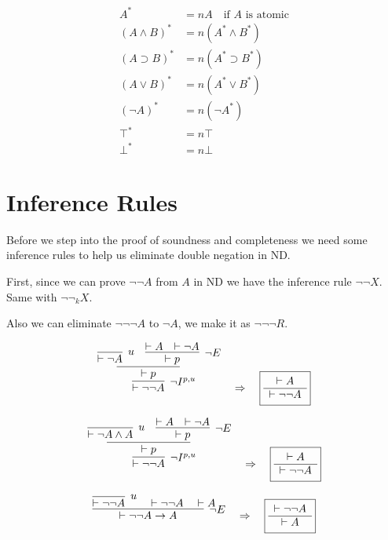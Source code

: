 \documentclass{article}
\begin{document}
\begin{align*}
A^* &= nA \quad \text{if } A \text{ is atomic} \\
(A \land B)^* &= n(A^* \land B^*) \\
(A \supset B)^* &= n(A^* \supset B^*) \\
(A \lor B)^* &= n(A^* \lor B^*) \\
(\neg A)^* &= n(\neg A^*) \\
\top^* &= n\top \\
\bot^* &= n\bot
\end{align*}




\section{Inference Rules}
Before we step into the proof of soundness and completeness we need some 
inference rules to help us eliminate double negation in ND.

First, since we can prove $\neg\neg A$ from $A$ in ND we 
have the inference rule $\neg\neg X$. Same with $\neg\neg_{k}X$.

Also we can eliminate $\neg\neg\neg A$ to $\neg A$, we make 
it as $\neg\neg\neg R$.

\[
\infer[\neg I^{p,u}]{\vdash \neg\neg A}{
  \infer{\vdash p}{
    \infer[u]{\vdash \neg A}{}
    \quad
    \infer[\neg E]{\vdash p}{
      \vdash A & \vdash \neg A
    }
  }
}
\quad \Rightarrow \quad
\fbox{$
  \begin{array}{c}
  \vdash A \\
  \hline
  \vdash \neg\neg A
  \end{array}
$}
\]

\[
\infer[\neg I^{p,u}]{\vdash \neg\neg A}{
  \infer{\vdash p}{
    \infer[u]{\vdash \neg A \land A}{}
    \quad
    \infer[\neg E]{\vdash p}{
      \vdash A & \vdash \neg A
    }
  }
}
\quad \Rightarrow \quad
\fbox{$
  \begin{array}{c}
  \vdash A \\
  \hline
  \vdash \neg\neg A
  \end{array}
$}
\]

\[
\infer[\neg E]{\vdash \neg\neg A \rightarrow A}{
  \infer[u]{\vdash \neg\neg A}{}
  \quad
  \vdash \neg\neg A
  \quad
  \vdash A
}
\quad \Rightarrow \quad
\fbox{$
  \begin{array}{c}
  \vdash \neg\neg A \\
  \hline
  \vdash A
  \end{array}
$}
\]
\end{document}
